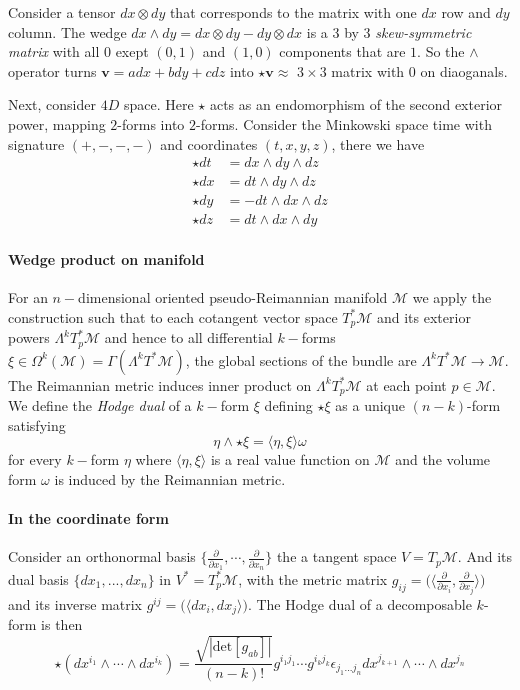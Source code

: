 Consider a tensor $dx \otimes dy$ that corresponds to the matrix with one $dx$ row and $dy$ column. The wedge $dx\wedge dy = dx\otimes dy - dy\otimes dx$ is a 3 by 3 \textit{skew-symmetric matrix} with all $0$ exept $(0,1)$ and $(1,0)$ components that are $1$. 
So the $\wedge$ operator turns $\boldsymbol{v} = adx + bdy + cdz$ into $\star\boldsymbol{v}\approx$ $3\times 3$ matrix with $0$ on diaoganals.

Next, consider $4D$ space.
Here $\star$ acts as an endomorphism of the second exterior power, mapping $2$-forms into $2$-forms. 
Consider the Minkowski space time with signature $(+,-,-,-)$ and coordinates $(t,x,y,z)$, there we have
\begin{align}
\star dt &= dx \wedge dy \wedge dz \\
\star dx &= dt \wedge dy \wedge dz \\
\star dy &= -dt \wedge dx \wedge dz \\ 
\star dz &= dt \wedge dx \wedge dy 
\end{align}

\paragraph{Wedge product on manifold}
For an $n-$dimensional oriented pseudo-Reimannian manifold $\mathcal{M}$ we apply the construction such that to each cotangent vector space $T^* _p \mathcal{M}$ and its exterior powers $\Lambda^k T_p ^* \mathcal{M}$ and hence to all differential $k-$forms $\xi\in\Omega^k(\mathcal{M})=\Gamma(\Lambda^k T^* \mathcal{M})$, the global sections of the bundle are $\Lambda^k T^*\mathcal{M}\rightarrow \mathcal{M}$. 
The Reimannian metric induces inner product on $\Lambda^k T_p ^* \mathcal{M}$ at each point $p\in\mathcal{M}$. We define the \textit{Hodge dual} of a $k-$form $\xi$ defining $\star\xi$ as a unique $(n-k)$-form satisfying
\begin{equation}
\eta\wedge\star\xi = \langle\eta,\xi\rangle\omega
\end{equation}
for every $k-$form $\eta$ where $\langle\eta,\xi\rangle$ is a real value function on $\mathcal{M}$ and the volume form $\omega$ is induced by the Reimannian metric.

\paragraph{In the coordinate form}
Consider an orthonormal basis $\{ \frac{\partial}{\partial x_1}, \cdots,\frac{\partial}{\partial x_n} \}$ the a tangent space $V=T_p\mathcal{M}$. And its dual basis $\{ dx_1, ..., dx_n \}$ in $V^* = T_p ^*\mathcal{M}$, with the metric matrix $g_{ij} = \big(\langle\frac{\partial}{\partial x_i},\frac{\partial}{\partial x_j}\rangle\big)$ and its inverse matrix $g^{ij} = \big(\langle dx_i, dx_j \rangle\big)$. The Hodge dual of a decomposable $k$-form is then 
\begin{equation}
\star(dx^{i_1}\wedge\cdots\wedge dx^{i_k}) = \frac{\sqrt{|\text{det}[g_{ab}]|}}{(n-k)!}g^{i_1 j_1}\cdots g^{i_k j_k} \epsilon_{j_1 ... j_n} dx^{j_{k+1}}\wedge\cdots\wedge dx^{j_n}
\end{equation}

